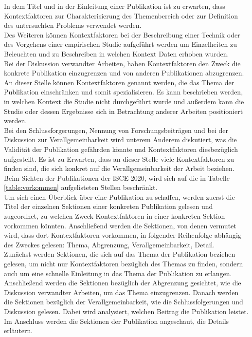 In dem Titel und in der Einleitung einer Publikation ist zu erwarten, dass Kontextfaktoren zur Charakterisierung des Themenbereich oder zur Definition des untersuchten Problems verwendet werden. \\
Des Weiteren können Kontextfaktoren bei der Beschreibung einer Technik oder des Vorgehens einer empirischen Studie aufgeführt werden um Einzelheiten zu Beleuchten und zu Beschreiben in welchen Kontext Daten erhoben wurden. \\
Bei der Diskussion verwandter Arbeiten, haben Kontextfaktoren den Zweck die konkrete Publikation einzugrenzen und von anderen Publikationen abzugrenzen. An dieser Stelle können Kontextfaktoren genannt werden, die das Thema der Publikation einschränken und somit spezialisieren. Es kann beschrieben werden, in welchen Kontext die Studie nicht durchgeführt wurde und außerdem kann die Studie oder dessen Ergebnisse sich in Betrachtung anderer Arbeiten positioniert werden. \\
Bei den Schlussforgerungen, Nennung von Forschungsbeiträgen und bei der Diskussion zur Verallgemeinbarkeit wird unterem Anderem diskutiert, was die Validität der Publikation gefährden könnte und Kontextfaktoren diesbezüglich aufgestellt. Es ist zu Erwarten, dass an dieser Stelle viele Kontextfaktoren zu finden sind, die sich konkret auf die Verallgemeinbarkeit der Arbeit beziehen. \\





Beim Sichten der Publikationen der ISCE 2020, wird sich auf die in Tabelle  \ref{table:vorkommen} aufgelisteten Stellen beschränkt. \\
Um sich einen Überblick über eine Publikation zu schaffen, werden zuerst die Titel der einzelnen Sektionen einer konkreten Publikation gelesen und zugeordnet, zu welchen Zweck Kontextfaktoren in einer konkreten Sektion vorkommen könnten. Anschließend werden die Sektionen, von denen vermutet wird, dass dort Kontextfaktoren vorkommen, in folgender Reihenfolge abhängig des Zweckes gelesen: Thema, Abgrenzung, Verallgemeinbarkeit, Detail. \\
Zunächst werden Sektionen, die sich auf das Thema der Publikation beziehen gelesen, um nicht nur Kontextfaktoren bezüglich des Themas zu finden, sondern auch um eine schnelle Einleitung in das Thema der Publikation zu erlangen. Anschließend werden die Sektionen bezüglich der Abgrenzung gesichtet, wie die Diskussion verwandter Arbeiten, um das Thema einzugrenzen. Danach werden die Sektionen bezüglich der Verallgemeinbarkeit, wie die Schlussfolgerungen und Diskussion gelesen. Dabei wird analysiert, welchen Beitrag die Publikation leistet. Im Anschluss werden die Sektionen der Publikation angeschaut, die Details erläutern.  \\

